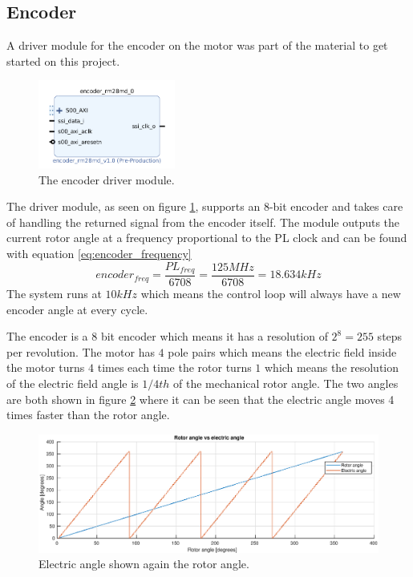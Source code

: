 \subsection{Encoder}

A driver module for the encoder on the motor was part of the material to get started on this project. 

\begin{figure}[H]
	\centering
	\includegraphics[width=0.4\textwidth]{pictures/software/encoder_module.png}
	\caption{The encoder driver module.}
	\label{fig:encoder_module}
\end{figure}
The driver module, as seen on figure \ref{fig:encoder_module}, supports an 8-bit encoder and takes care of handling the returned signal from the encoder itself. The module outputs the current rotor angle at a frequency proportional to the PL clock and can be found with equation \ref{eq:encoder_frequency}
\begin{equation}
encoder_{freq} = \frac{PL_{freq}}{6708} = \frac{125MHz}{6708} = 18.634kHz
\label{eq:encoder_frequency}
\end{equation}
The system runs at $10kHz$ which means the control loop will always have a new encoder angle at every cycle.


The encoder is a 8 bit encoder which means it has a resolution of $2^8 = 255$ steps per revolution. The motor has $4$ pole pairs which means the electric field inside the motor turns $4$ times each time the rotor turns $1$ which means the resolution of the electric field angle is $1/4th$ of the mechanical rotor angle.
The two angles are both shown in figure \ref{fig:rotor_vs_electric_angle} where it can be seen that the electric angle moves 4 times faster than the rotor angle.

\begin{figure}[H]
	\centering
	\includegraphics[width=1\textwidth]{pictures/software/rotor_vs_electric_angle.eps}
	\caption{Electric angle shown again the rotor angle.}
	\label{fig:rotor_vs_electric_angle}
\end{figure}


